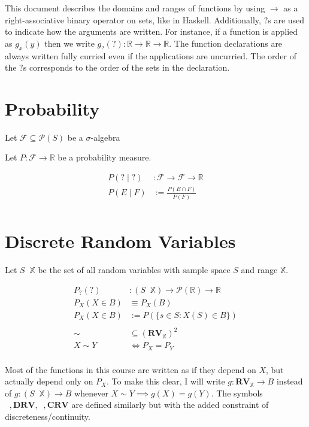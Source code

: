 \documentclass[12pt]{article}
\theoremstyle{definition}
\newcommand{\R}{\mathbb{R}}
\newcommand{\F}{\mathcal{F}}
\newcommand{\X}{\mathbb{X}}
\newcommand{\RV}{\mathbf{RV}}
\newcommand{\DRV}{\mathbf{DRV}}
\newcommand{\CRV}{\mathbf{CRV}}
\renewcommand{\P}{{\mathcal{P}}}
\DeclareMathOperator{\rvto}{\xrightarrow{RV}}
\DeclareMathOperator{\drvto}{\xrightarrow{DRV}}
\DeclareMathOperator{\crvto}{\xrightarrow{CRV}}
\begin{document}
\noindent This document describes the domains and ranges of functions by using $\to$ as a right-associative binary operator on sets, like in Haskell.
Additionally, $?$s are used to indicate how the arguments are written.
For instance, if a function is applied as $g_x(y)$ then we write $g_{?}(?) : \R \to \R \to \R$.
The function declarations are always written fully curried even if the applications are uncurried.
The order of the $?$s corresponds to the order of the sets in the declaration.

\setcounter{section}{3}

\section{Probability}

\noindent Let $\F \subseteq \P(S)$ be a $\sigma$-algebra

\noindent Let $P : \F \to \R$ be a probability measure.

\begin{align*}
  P(? \mid ?) &: \F \to \F \to \R\\
  P(E \mid F) &:= \frac{P(E \cap F)}{P(F)}\\
\end{align*}

\section{Discrete Random Variables}

\noindent Let $S \rvto \X$ be the set of all random variables with sample space $S$ and range $\X$.

\begin{align*}
  P_{?}(?) &: (S \rvto \X) \to \P(\R) \to \R\\
  P_X(X \in B) &\equiv P_X(B)\\
  P_X(X \in B) &:= P(\{s \in S : X(S) \in B\})\\
  \\
  \sim &\subseteq (\RV_\X)^2\\
  X \sim Y &\iff P_X = P_Y\\
\end{align*}

\noindent Most of the functions in this course are written as if they depend on $X$, but actually depend only on $P_X$.
To make this clear, I will write $g : \RV_\X \to B$ instead of $g : (S \rvto \X) \to B$ whenever $X \sim Y \implies g(X) = g(Y)$.
The symbols $\drvto, \DRV, \crvto, \CRV$ are defined similarly but with the added constraint of discreteness/continuity. 
\end{document}

